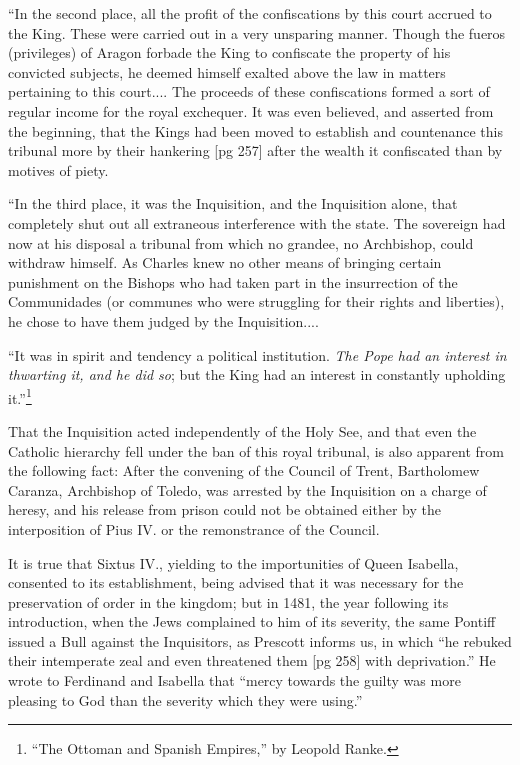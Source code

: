 “In the second place, all the profit of the confiscations
by this court accrued to the King. These
were carried out in a very unsparing manner.
Though the fueros (privileges) of Aragon forbade
the King to confiscate the property of his convicted
subjects, he deemed himself exalted above
the law in matters pertaining to this court....
The proceeds of these confiscations formed a sort
of regular income for the royal exchequer. It
was even believed, and asserted from the beginning,
that the Kings had been moved to establish
and countenance this tribunal more by their hankering
[pg 257]
after the wealth it confiscated than by
motives of piety.

“In the third place, it was the Inquisition, and
the Inquisition alone, that completely shut out
all extraneous interference with the state. The
sovereign had now at his disposal a tribunal from
which no grandee, no Archbishop, could withdraw
himself. As Charles knew no other means of
bringing certain punishment on the Bishops who
had taken part in the insurrection of the Communidades
(or communes who were struggling for
their rights and liberties), he chose to have them
judged by the Inquisition....

“It was in spirit and tendency a political institution.
\emph{The Pope had an interest in thwarting it,
and he did so}; but the King had an interest in
constantly upholding it.”\footnote{“The
Ottoman and Spanish Empires,” by Leopold Ranke.}

That the Inquisition acted independently of the
Holy See, and that even the Catholic hierarchy
fell under the ban of this royal tribunal, is also
apparent from the following fact: After the convening
of the Council of Trent, Bartholomew Caranza,
Archbishop of Toledo, was arrested by the
Inquisition on a charge of heresy, and his release
from prison could not be obtained either by the
interposition of Pius IV. or the remonstrance of
the Council.

It is true that Sixtus IV., yielding to the importunities
of Queen Isabella, consented to its establishment,
being advised that it was necessary
for the preservation of order in the kingdom; but
in 1481, the year following its introduction, when
the Jews complained to him of its severity, the
same Pontiff issued a Bull against the Inquisitors,
as Prescott informs us, in which “he rebuked
their intemperate zeal and even threatened them
[pg 258]
with deprivation.” He wrote to Ferdinand and
Isabella that “mercy towards the guilty was more
pleasing to God than the severity which they were
using.”

